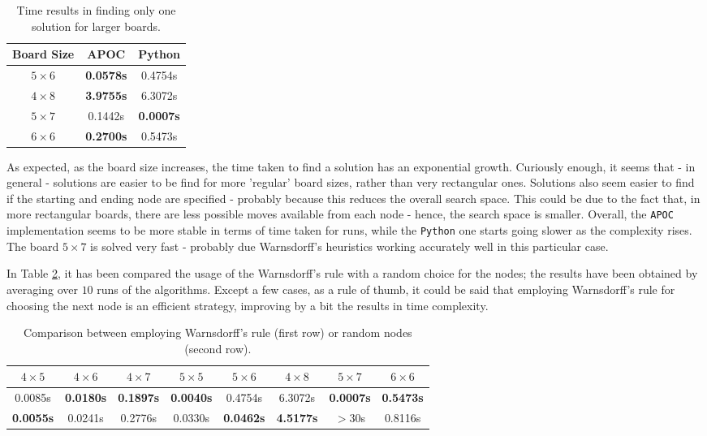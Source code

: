 \documentclass[conference]{IEEEtran}
\begin{document}
\begin{table}[ht]
\centering
\begin{tabular}{|c|c c|}
\hline
\textbf{Board Size} & \textbf{APOC} & \textbf{Python} \\ \hline
\textbf{$5 \times 6$} & \textbf{0.0578s} & 0.4754s \\ \hline
\textbf{$4 \times 8$} & \textbf{3.9755s} & 6.3072s \\ \hline
\textbf{$5 \times 7$} & 0.1442s & \textbf{0.0007s} \\ \hline
\textbf{$6 \times 6$} & \textbf{0.2700s} & 0.5473s \\ \hline
\end{tabular}
\caption{Time results in finding only one solution for larger boards.}
\label{tab:onesolL}
\end{table}

As expected, as the board size increases, the time taken to find a solution has an exponential growth.
Curiously enough, it seems that - in general - solutions are easier to be find for more 'regular' board sizes, rather than very rectangular ones. Solutions also seem easier to find if the starting and ending node are specified - probably because this reduces the overall search space.
This could be due to the fact that, in more rectangular boards, there are less possible moves available from each node - hence, the search space is smaller.
Overall, the \texttt{APOC} implementation seems to be more stable in terms of time taken for runs, while the \texttt{Python} one starts going slower as the complexity rises.
The board $5 \times 7$ is solved very fast - probably due Warnsdorff's heuristics working accurately well in this particular case.

In Table \ref{tab:warn}, it has been compared the usage of the Warnsdorff's rule with a random choice for the nodes; the results have been obtained by averaging over $10$ runs of the algorithms. Except a few cases, as a rule of thumb, it could be said that employing Warnsdorff's rule for choosing the next node is an efficient strategy, improving by a bit the results in time complexity.

\begin{table}[ht]
	\setlength{\tabcolsep}{3pt}
	\centering
	\begin{tabular}{|c|c|c|c|c|c|c|c|}
		\hline
		 $4 \times 5$ & $4 \times 6$ & $4 \times 7$ & $5 \times 5$ & $5 \times 6$ & $4 \times 8$ & $5 \times 7$ & $6 \times 6$ \\ \hline
		 \scriptsize 0.0085s & \scriptsize \textbf{0.0180s} & \scriptsize\textbf{ 0.1897s} & \scriptsize \textbf{0.0040s} & \scriptsize 0.4754s & \scriptsize 6.3072s & \scriptsize \textbf{0.0007s} & \scriptsize \textbf{0.5473s} \\
		 \scriptsize  \textbf{0.0055s} & \scriptsize 0.0241s & \scriptsize 0.2776s & \scriptsize 0.0330s & \scriptsize \textbf{0.0462s} & \scriptsize \textbf{4.5177s} & \scriptsize $>$30s & \scriptsize 0.8116s \\ \hline
	\end{tabular}
	\caption{Comparison between employing Warnsdorff's rule (first row) or random nodes (second row).}
	\label{tab:warn}
\end{table}
\end{document}
